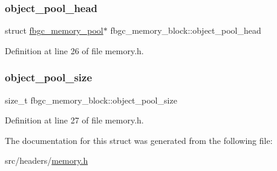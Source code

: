 \subsubsection{\texorpdfstring{object\+\_\+pool\+\_\+head}{object\_pool\_head}}
{\footnotesize\ttfamily struct \hyperlink{structfbgc__memory__pool}{fbgc\+\_\+memory\+\_\+pool}$\ast$ fbgc\+\_\+memory\+\_\+block\+::object\+\_\+pool\+\_\+head}



Definition at line 26 of file memory.\+h.

\mbox{\label{structfbgc__memory__block_a9e2f095bebf9ee6768bfd741fc481349}} 
\subsubsection{\texorpdfstring{object\+\_\+pool\+\_\+size}{object\_pool\_size}}
{\footnotesize\ttfamily size\+\_\+t fbgc\+\_\+memory\+\_\+block\+::object\+\_\+pool\+\_\+size}



Definition at line 27 of file memory.\+h.



The documentation for this struct was generated from the following file\+:\begin{DoxyCompactItemize}
\item 
src/headers/\hyperlink{memory_8h}{memory.\+h}\end{DoxyCompactItemize}
